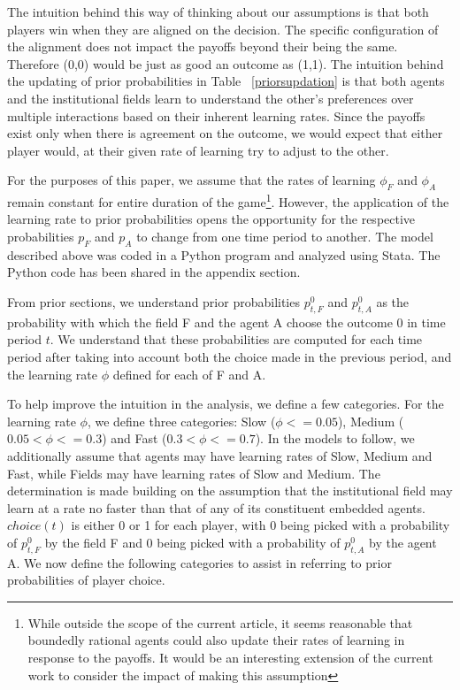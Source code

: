 \documentclass[12pt,letterpaper]{article}
\begin{document}
The intuition behind this way of thinking about our assumptions is that both players win when they are aligned on the decision. The specific configuration of the alignment does not impact the payoffs beyond their being the same. Therefore (0,0) would be just as good an outcome as (1,1). The intuition behind the updating of prior probabilities in Table ~\ref{priorsupdation} is that both agents and the institutional fields learn to understand the other's preferences over multiple interactions based on their inherent learning rates. Since the payoffs exist only when there is agreement on the outcome, we would expect that either player would, at their given rate of learning try to adjust to the other.
 
For the purposes of this paper, we assume that the rates of learning $\phi_F$ and $\phi_A$ remain constant for entire duration of the game\footnote{While outside the scope of the current article, it seems reasonable that boundedly rational agents could also update their rates of learning in response to the payoffs. It would be an interesting extension of the current work to consider the impact of making this assumption}. However, the application of the learning rate to prior probabilities opens the opportunity for the respective probabilities $p_F$ and $p_A$ to change from one time period to another. The model described above was coded in a Python program and analyzed using Stata. The Python code has been shared in the appendix section.

From prior sections, we understand prior probabilities $p_{t,F}^0$ and $p_{t,A}^0$ as the probability with which the field F and the agent A  choose the outcome 0 in time period $t$. We understand that these probabilities are computed for each time period after taking into account both the choice made in the previous period, and the learning rate $\phi$ defined for each of F and A. 

To help improve the intuition in the analysis, we define a few categories. For the learning rate $\phi$, we define three categories: Slow ($\phi <= 0.05$), Medium ($0.05 < \phi <= 0.3$) and Fast  ($0.3 < \phi <= 0.7$). In the models to follow, we additionally assume that agents may have learning rates of Slow, Medium and Fast, while Fields may have learning rates of Slow and Medium. The determination is made building on the assumption that the institutional field may learn at a rate no faster than that of any of its constituent embedded agents. $choice(t)$ is either 0 or 1 for each player, with 0 being picked with a probability of $p_{t,F}^0$ by the field F and 0 being picked with a probability of $p_{t,A}^0$ by the agent A. We now define the following categories to assist in referring to prior probabilities of player choice. 
\end{document}
